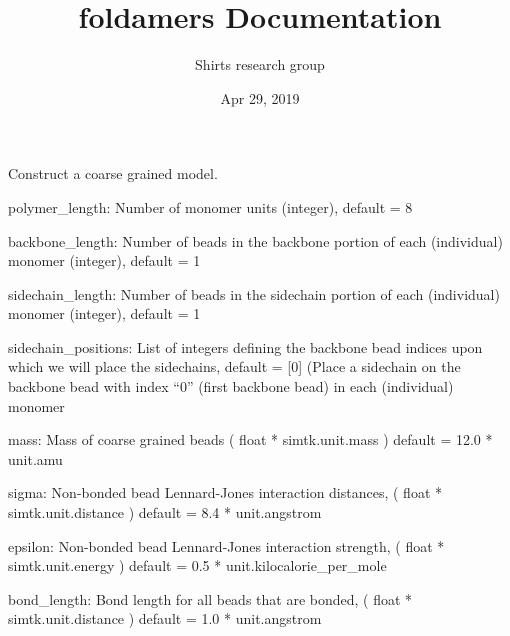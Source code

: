 \documentclass[letterpaper,10pt,english]{sphinxmanual}
\title{foldamers Documentation}
\date{Apr 29, 2019}
\author{Shirts research group}
\begin{document}
\pagestyle{empty}
\sphinxmaketitle
\pagestyle{plain}
\sphinxtableofcontents
\pagestyle{normal}
\label{\detokenize{index::doc}}

\label{\detokenize{index:module-cg_model.cgmodel}}

\begin{fulllineitems}
\label{\detokenize{index:cg_model.cgmodel.CGModel}}
Construct a coarse grained model.

polymer\_length: Number of monomer units (integer), default = 8

backbone\_length: Number of beads in the backbone 
portion of each (individual) monomer (integer), default = 1

sidechain\_length: Number of beads in the sidechain
portion of each (individual) monomer (integer), default = 1

sidechain\_positions: List of integers defining the backbone
bead indices upon which we will place the sidechains,
default = {[}0{]} (Place a sidechain on the backbone bead with
index “0” (first backbone bead) in each (individual) monomer

mass: Mass of coarse grained beads ( float * simtk.unit.mass )
default = 12.0 * unit.amu

sigma: Non-bonded bead Lennard-Jones interaction distances,
( float * simtk.unit.distance )
default = 8.4 * unit.angstrom

epsilon: Non-bonded bead Lennard-Jones interaction strength,
( float * simtk.unit.energy )
default = 0.5 * unit.kilocalorie\_per\_mole

bond\_length: Bond length for all beads that are bonded,
( float * simtk.unit.distance )
default = 1.0 * unit.angstrom


\end{fulllineitems}
\end{document}
